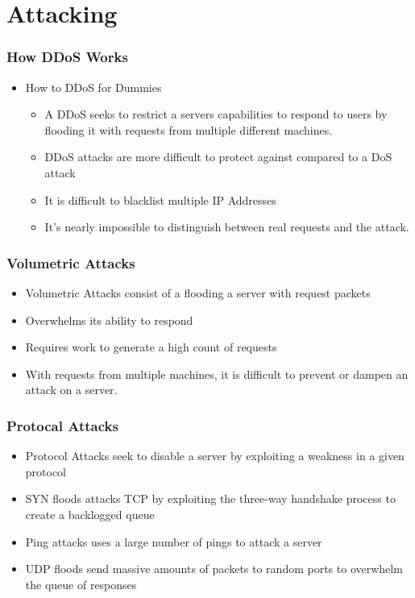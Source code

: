 \documentclass{beamer}
\begin{document}
\section{Attacking}

\begin{frame}
    \frametitle{How DDoS Works}
    \begin{itemize}
        \item How to DDoS for Dummies
            \begin{itemize}
                \item<+-> A DDoS seeks to restrict a servers capabilities to respond to users by flooding it with requests from multiple different machines.
                \item<+-> DDoS attacks are more difficult to protect against compared to a DoS attack
                \item<+-> It is difficult to blacklist multiple IP Addresses
                \item<+-> It's nearly impossible to distinguish between real requests and the attack.
            \end{itemize}
    \end{itemize}
\end{frame}

\begin{frame}
    \frametitle{Volumetric Attacks}
        \begin{itemize}
            \item<+-> Volumetric Attacks consist of a flooding a server with request packets
            \item<+-> Overwhelms its ability to respond
            \item<+-> Requires work to generate a high count of requests
            \item<+-> With requests from multiple machines, it is difficult to prevent or dampen an attack on a server.
    \end{itemize}
\end{frame}
\begin{frame}
    \frametitle{Protocal Attacks}
     \begin{itemize}
            \item<+-> Protocol Attacks seek to disable a server by exploiting a weakness in a given protocol
            \item<+-> SYN floods attacks TCP by exploiting the three-way handshake process to create a backlogged queue
            \item<+-> Ping attacks uses a large number of pings to attack a server
            \item<+-> UDP floods send massive amounts of packets to random ports to overwhelm the queue of responses
        \end{itemize}
\end{frame}
\end{document}
